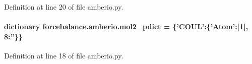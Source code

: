 Definition at line 20 of file amberio.\-py.

\hypertarget{namespaceforcebalance_1_1amberio_a84f51a0ccf50d3442cefb90f948653b0}{
\paragraph[{mol2\-\_\-pdict}]{\setlength{\rightskip}{0pt plus 5cm}dictionary forcebalance.\-amberio.\-mol2\-\_\-pdict = \{'C\-O\-U\-L'\-:\{'Atom'\-:\mbox{[}1\mbox{]}, 8\-:''\}\}}}\label{namespaceforcebalance_1_1amberio_a84f51a0ccf50d3442cefb90f948653b0}


Definition at line 18 of file amberio.\-py.


